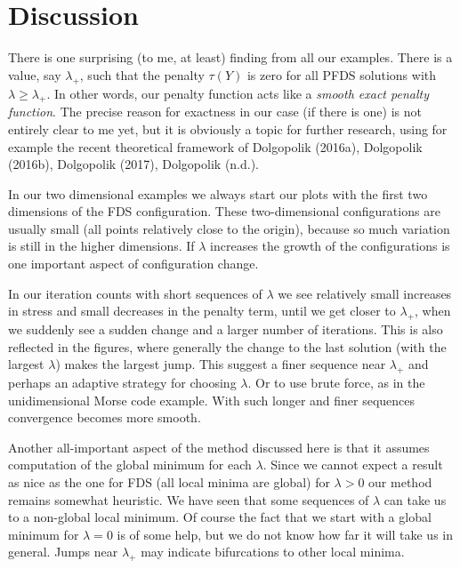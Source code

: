 \documentclass[
  12pt,
]{article}
\begin{document}
\hypertarget{discussion}{%
\section{Discussion}\label{discussion}}

There is one surprising (to me, at least) finding from all our examples.
There is a value, say \(\lambda_+\), such that the penalty \(\tau(Y)\)
is zero for all PFDS solutions with \(\lambda\geq\lambda_+\). In other
words, our penalty function acts like a \emph{smooth exact penalty
function}. The precise reason for exactness in our case (if there is
one) is not entirely clear to me yet, but it is obviously a topic for
further research, using for example the recent theoretical framework of
Dolgopolik (2016a), Dolgopolik (2016b), Dolgopolik (2017), Dolgopolik
(n.d.).

In our two dimensional examples we always start our plots with the first
two dimensions of the FDS configuration. These two-dimensional
configurations are usually small (all points relatively close to the
origin), because so much variation is still in the higher dimensions. If
\(\lambda\) increases the growth of the configurations is one important
aspect of configuration change.

In our iteration counts with short sequences of \(\lambda\) we see
relatively small increases in stress and small decreases in the penalty
term, until we get closer to \(\lambda_+\), when we suddenly see a
sudden change and a larger number of iterations. This is also reflected
in the figures, where generally the change to the last solution (with
the largest \(\lambda\)) makes the largest jump. This suggest a finer
sequence near \(\lambda_+\) and perhaps an adaptive strategy for
choosing \(\lambda\). Or to use brute force, as in the unidimensional
Morse code example. With such longer and finer sequences convergence
becomes more smooth.

Another all-important aspect of the method discussed here is that it
assumes computation of the global minimum for each \(\lambda\). Since we
cannot expect a result as nice as the one for FDS (all local minima are
global) for \(\lambda>0\) our method remains somewhat heuristic. We have
seen that some sequences of \(\lambda\) can take us to a non-global
local minimum. Of course the fact that we start with a global minimum
for \(\lambda=0\) is of some help, but we do not know how far it will
take us in general. Jumps near \(\lambda_+\) may indicate bifurcations
to other local minima.
\end{document}
